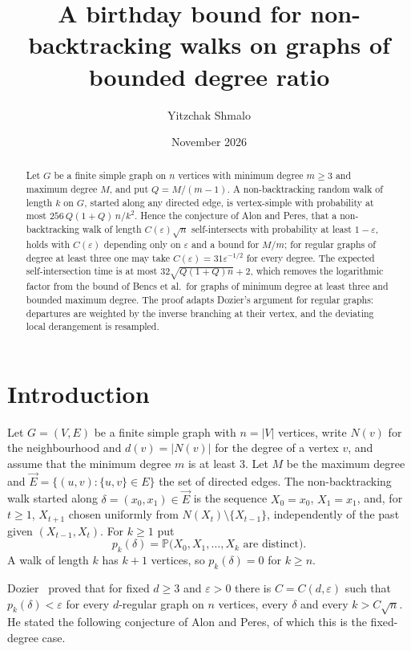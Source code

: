 \documentclass[11pt]{amsart}
\title[Non-backtracking walks on graphs of bounded degree ratio]{A birthday bound for non-backtracking walks on graphs
of bounded degree ratio}
\author{Yitzchak Shmalo}
\date{November 2026}
\theoremstyle{remark}
\newcommand{\PP}{\mathbb{P}}
\newcommand{\vE}{\vec{E}}
\begin{document}
\begin{abstract}
Let $G$ be a finite simple graph on $n$ vertices with minimum degree $m\ge3$ and maximum degree $M$, and put
$Q=M/(m-1)$. A non-backtracking random walk of length $k$ on $G$, started along any directed edge, is
vertex-simple with probability at most $256\,Q(1+Q)\,n/k^2$. Hence the conjecture of Alon and Peres, that a
non-backtracking walk of length $C(\varepsilon)\sqrt n$ self-intersects with probability at least $1-\varepsilon$,
holds with $C(\varepsilon)$ depending only on $\varepsilon$ and a bound for $M/m$; for regular graphs of degree at
least three one may take $C(\varepsilon)=31\varepsilon^{-1/2}$ for every degree. The expected self-intersection time
is at most $32\sqrt{Q(1+Q)n}+2$, which removes the logarithmic factor from the bound of Bencs et al.\ for graphs of
minimum degree at least three and bounded maximum degree. The proof adapts Dozier's argument for regular graphs:
departures are weighted by the inverse branching at their vertex, and the deviating local derangement is resampled.
\end{abstract}
\maketitle

\section{Introduction}\label{sec:intro}

Let $G=(V,E)$ be a finite simple graph with $n=|V|$ vertices, write $N(v)$ for the neighbourhood and $d(v)=|N(v)|$
for the degree of a vertex $v$, and assume that the minimum degree $m$ is at least $3$. Let $M$ be the maximum degree
and $\vE=\{(u,v):\{u,v\}\in E\}$ the set of directed edges. The non-backtracking walk started along
$\delta=(x_0,x_1)\in\vE$ is the sequence $X_0=x_0$, $X_1=x_1$, and, for $t\ge1$, $X_{t+1}$ chosen uniformly from
$N(X_t)\setminus\{X_{t-1}\}$, independently of the past given $(X_{t-1},X_t)$. For $k\ge1$ put
\[
p_k(\delta)=\PP\bigl(X_0,X_1,\dots,X_k\text{ are distinct}\bigr).
\]
A walk of length $k$ has $k+1$ vertices, so $p_k(\delta)=0$ for $k\ge n$.

Dozier~\cite{Doz26} proved that for fixed $d\ge3$ and $\varepsilon>0$ there is $C=C(d,\varepsilon)$ such that
$p_k(\delta)<\varepsilon$ for every $d$-regular graph on $n$ vertices, every $\delta$ and every $k>C\sqrt n$. He stated
the following conjecture of Alon and Peres, of which this is the fixed-degree case.
\end{document}
